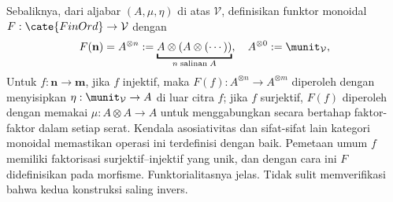 \begin{catatan}
	Sebaliknya, dari aljabar $(A,\mu,\eta)$ di atas $\mathcal{V}$, definisikan
	funktor monoidal $F:\cate{FinOrd}\to\mathcal{V}$ dengan
	\[ F(\mathbf{n}) = A^{\otimes n} := \underbracket{A \otimes (A \otimes (\cdots))}_{n\;\text{salinan}\; A}, \quad A^{\otimes 0} := \munit_{\mathcal{V}}, \]
	Untuk $f:\mathbf{n}\to\mathbf{m}$, jika $f$ injektif, maka
	$F(f):A^{\otimes n}\to A^{\otimes m}$ diperoleh dengan menyisipkan
	$\eta:\munit_{\mathcal{V}}\to A$ di luar citra $f$; jika $f$ surjektif,
	$F(f)$ diperoleh dengan memakai $\mu:A\otimes A\to A$ untuk menggabungkan
	secara bertahap faktor-faktor dalam setiap serat. Kendala asosiativitas dan
	sifat-sifat lain kategori monoidal memastikan operasi ini terdefinisi dengan
	baik. Pemetaan umum $f$ memiliki faktorisasi surjektif--injektif yang unik,
	dan dengan cara ini $F$ didefinisikan pada morfisme. Funktorialitasnya
	jelas. Tidak sulit memverifikasi bahwa kedua konstruksi saling invers.
\end{catatan}
